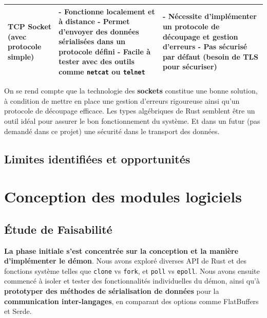 \documentclass{article}
\begin{document}
\begin{table}[H]
\begin{tabularx}{\textwidth}{|l|X|X|}
      \hline
      TCP Socket (avec protocole simple) & 
      - Fonctionne localement et à distance \newline
      - Permet d’envoyer des données sérialisées dans un protocole défini \newline
      - Facile à tester avec des outils comme \texttt{netcat} ou \texttt{telnet} &
      - Nécessite d’implémenter un protocole de découpage et gestion d’erreurs \newline
      - Pas sécurisé par défaut (besoin de TLS pour sécuriser) \\
      \hline
    \end{tabularx}
\end{table}

On se rend compte que la technologie des \textbf{sockets} constitue une bonne solution, à condition de mettre en place une gestion d’erreurs rigoureuse ainsi qu’un protocole de découpage efficace. Les types algébriques de Rust semblent être un outil idéal pour assurer le bon fonctionnement du système. Et dans un futur (pas demandé dans ce projet) une sécurité dans le transport des données.

\subsection{Limites identifiées et opportunités}


\section{Conception des modules logiciels}

\subsection{Étude de Faisabilité}

\textbf{La phase initiale s’est concentrée sur la conception et la manière d’implémenter le démon}. Nous avons exploré diverses API de Rust et des fonctions système telles que \texttt{clone} vs \texttt{fork}, et \texttt{poll} vs \texttt{epoll}. Nous avons ensuite commencé à isoler et tester des fonctionnalités individuelles du démon, ainsi qu'à \textbf{prototyper des méthodes de sérialisation de données} pour la \textbf{communication inter-langages}, en comparant des options comme FlatBuffers et Serde.
\end{document}
